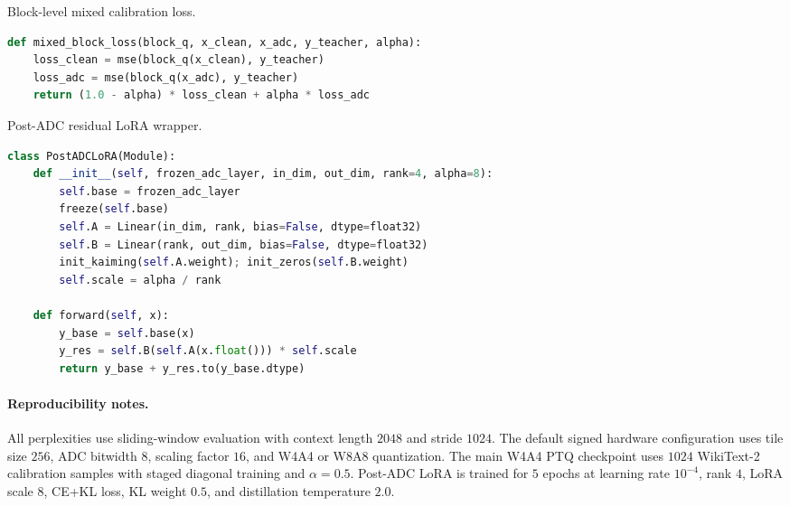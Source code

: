 \documentclass[letterpaper]{article} %
\theoremstyle{plain}
\begin{document}
\begin{listing}[tb]
\caption{Block-level mixed calibration loss.}
\label{lst:mixed_loss}
\begin{lstlisting}[language=Python]
def mixed_block_loss(block_q, x_clean, x_adc, y_teacher, alpha):
    loss_clean = mse(block_q(x_clean), y_teacher)
    loss_adc = mse(block_q(x_adc), y_teacher)
    return (1.0 - alpha) * loss_clean + alpha * loss_adc
\end{lstlisting}
\end{listing}

\begin{listing}[tb]
\caption{Post-ADC residual LoRA wrapper.}
\label{lst:lora}
\begin{lstlisting}[language=Python]
class PostADCLoRA(Module):
    def __init__(self, frozen_adc_layer, in_dim, out_dim, rank=4, alpha=8):
        self.base = frozen_adc_layer
        freeze(self.base)
        self.A = Linear(in_dim, rank, bias=False, dtype=float32)
        self.B = Linear(rank, out_dim, bias=False, dtype=float32)
        init_kaiming(self.A.weight); init_zeros(self.B.weight)
        self.scale = alpha / rank

    def forward(self, x):
        y_base = self.base(x)
        y_res = self.B(self.A(x.float())) * self.scale
        return y_base + y_res.to(y_base.dtype)
\end{lstlisting}
\end{listing}

\paragraph{Reproducibility notes.}
All perplexities use sliding-window evaluation with context length $2048$ and stride $1024$. The default signed hardware configuration uses tile size $256$, ADC bitwidth $8$, scaling factor $16$, and W4A4 or W8A8 quantization. The main W4A4 PTQ checkpoint uses $1024$ WikiText-2 calibration samples with staged diagonal training and $\alpha = 0.5$. Post-ADC LoRA is trained for $5$ epochs at learning rate $10^{-4}$, rank $4$, LoRA scale $8$, CE+KL loss, KL weight $0.5$, and distillation temperature $2.0$.


\end{document}
